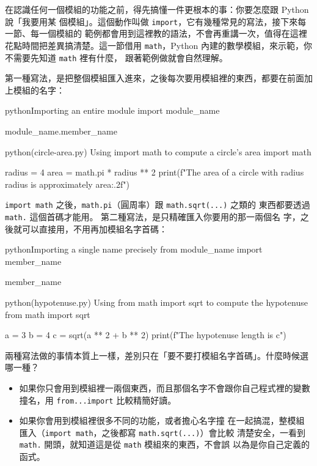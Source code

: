 在認識任何一個模組的功能之前，得先搞懂一件更根本的事：你要怎麼跟 Python 說「我要用某
個模組」。這個動作叫做 \texttt{import}，它有幾種常見的寫法，接下來每一節、每一個模組的
範例都會用到這裡教的語法，不會再重講一次，值得在這裡花點時間把差異搞清楚。這一節借用
\texttt{math}，Python 內建的數學模組，來示範，你不需要先知道 \texttt{math} 裡有什麼，
跟著範例做就會自然理解。

第一種寫法，是把整個模組匯入進來，之後每次要用模組裡的東西，都要在前面加上模組的名字：

\begin{code}{python}{Importing an entire module}
import module_name

module_name.member_name
\end{code}

\begin{example}{python}{(circle-area.py) Using import math to compute a circle's area}
import math

radius = 4
area = math.pi * radius ** 2
print(f"The area of a circle with radius {radius} is approximately {area:.2f}")
\end{example}


\texttt{import math} 之後，\texttt{math.pi}（圓周率）跟 \texttt{math.sqrt(...)} 之類的
東西都要透過 \texttt{math.} 這個首碼才能用。
第二種寫法，是只精確匯入你要用的那一兩個名
字，之後就可以直接用，不用再加模組名字首碼：

\begin{code}{python}{Importing a single name precisely}
from module_name import member_name

member_name
\end{code}

\begin{example}{python}{(hypotenuse.py) Using from math import sqrt to compute the hypotenuse}
from math import sqrt

a = 3
b = 4
c = sqrt(a ** 2 + b ** 2)
print(f"The hypotenuse length is {c}")
\end{example}


兩種寫法做的事情本質上一樣，差別只在「要不要打模組名字首碼」。什麼時候選哪一種？

\begin{itemize}
\item 如果你只會用到模組裡一兩個東西，而且那個名字不會跟你自己程式裡的變數撞名，用
\texttt{from...import} 比較精簡好讀。
\item 如果你會用到模組裡很多不同的功能，或者擔心名字撞
在一起搞混，整模組匯入（\texttt{import math}，之後都寫 \texttt{math.sqrt(...)}）會比較
清楚安全，一看到 \texttt{math.} 開頭，就知道這是從 \texttt{math} 模組來的東西，不會誤
以為是你自己定義的函式。
\end{itemize}

